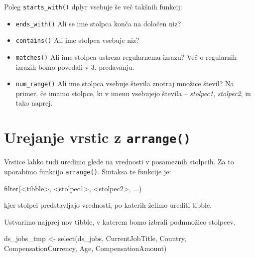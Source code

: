 \documentclass[
]{book}
\newenvironment{Shaded}{\begin{snugshade}}{\end{snugshade}}
\newcommand{\FunctionTok}[1]{\textcolor[rgb]{0.00,0.00,0.00}{#1}}
\newcommand{\NormalTok}[1]{#1}
\newcommand{\OtherTok}[1]{\textcolor[rgb]{0.56,0.35,0.01}{#1}}
\newcommand{\SpecialCharTok}[1]{\textcolor[rgb]{0.00,0.00,0.00}{#1}}
\providecommand{\tightlist}{%
  \setlength{\itemsep}{0pt}\setlength{\parskip}{0pt}}
\begin{document}
Poleg \texttt{starts\_with()} dplyr vsebuje še več takšnih funkcij:

\begin{itemize}
\tightlist
\item
  \texttt{ends\_with()} Ali se ime stolpca konča na določen niz?
\item
  \texttt{contains()} Ali ime stolpca vsebuje niz?
\item
  \texttt{matches()} Ali ime stolpca ustreza regularnemu izrazu? Več o regularnih izrazih bomo povedali v 3. predavanju.
\item
  \texttt{num\_range()} Ali ime stolpca vsebuje števila znotraj množice števil? Na primer, če imamo stolpce, ki v imenu vsebujejo števila -- \emph{stolpec1}, \emph{stolpec2}, in tako naprej.
\end{itemize}

\hypertarget{urejanje-vrstic-z-arrange}{%
\section{\texorpdfstring{Urejanje vrstic z \texttt{arrange()}}{Urejanje vrstic z arrange()}}\label{urejanje-vrstic-z-arrange}}

Vrstice lahko tudi uredimo glede na vrednosti v posameznih stolpcih. Za to uporabimo funkcijo \texttt{arrange()}. Sintaksa te funkcije je:

\begin{Shaded}
\begin{Highlighting}[]
\FunctionTok{filter}\NormalTok{(}\SpecialCharTok{\textless{}}\NormalTok{tibble}\SpecialCharTok{\textgreater{}}\NormalTok{, }\SpecialCharTok{\textless{}}\NormalTok{stolpec1}\SpecialCharTok{\textgreater{}}\NormalTok{, }\SpecialCharTok{\textless{}}\NormalTok{stolpec2}\SpecialCharTok{\textgreater{}}\NormalTok{, ...)}
\end{Highlighting}
\end{Shaded}

kjer stolpci predstavljajo vrednosti, po katerih želimo urediti tibble.

Ustvarimo najprej nov tibble, v katerem bomo izbrali podmnožico stolpcev.

\begin{Shaded}
\begin{Highlighting}[]
\NormalTok{ds\_jobs\_tmp }\OtherTok{\textless{}{-}} \FunctionTok{select}\NormalTok{(ds\_jobs, CurrentJobTitle, Country, }
\NormalTok{                      CompensationCurrency, Age, CompensationAmount)}
\end{Highlighting}
\end{Shaded}
\end{document}
